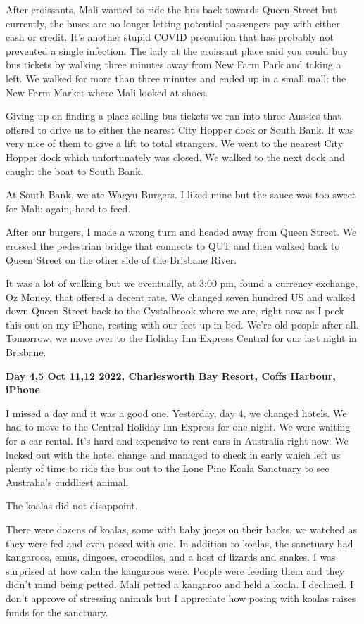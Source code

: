 After croissants, Mali wanted to ride the bus back towards Queen Street
but currently, the buses are no longer letting potential passengers pay
with either cash or credit. It's another stupid COVID precaution that
has probably not prevented a single infection. The lady at the croissant
place said you could buy bus tickets by walking three minutes away from
New Farm Park and taking a left. We walked for more than three minutes
and ended up in a small mall: the New Farm Market where Mali looked at
shoes.

Giving up on finding a place selling bus tickets we ran into three
Aussies that offered to drive us to either the nearest City Hopper dock
or South Bank. It was very nice of them to give a lift to total
strangers. We went to the nearest City Hopper dock which unfortunately
was closed. We walked to the next dock and caught the boat to South
Bank.

At South Bank, we ate Wagyu Burgers. I liked mine but the sauce was too
sweet for Mali: again, hard to feed.

After our burgers, I made a wrong turn and headed away from Queen
Street. We crossed the pedestrian bridge that connects to QUT and then
walked back to Queen Street on the other side of the Brisbane River.

It was a lot of walking but we eventually, at 3:00 pm, found a currency
exchange, Oz Money, that offered a decent rate. We changed seven hundred
US and walked down Queen Street back to the Cystalbrook where we are,
right now as I peck this out on my iPhone, resting with our feet up in
bed. We're old people after all. Tomorrow, we move over to the Holiday
Inn Express Central for our last night in Brisbane.

\textbf{Day 4,5 Oct 11,12 2022, Charlesworth Bay Resort, Coffs Harbour, iPhone}

I missed a day and it was a good one. Yesterday, day 4, we changed
hotels. We had to move to the Central Holiday Inn Express for one night.
We were waiting for a car rental. It's hard and expensive to rent cars
in Australia right now. We lucked out with the hotel change and managed
to check in early which left us plenty of time to ride the bus out to
the \href{https://lonepinekoalasanctuary.com/}{Lone Pine Koala
Sanctuary} to see Australia's cuddliest animal.

The koalas did not disappoint.

There were dozens of koalas, some with baby joeys on their backs, we
watched as they were fed and even posed with one. In addition to koalas,
the sanctuary had kangaroos, emus, dingoes, crocodiles, and a host of
lizards and snakes. I was surprised at how calm the kangaroos were.
People were feeding them and they didn't mind being petted. Mali petted
a kangaroo and held a koala. I declined. I don't approve of stressing
animals but I appreciate how posing with koalas raises funds for the
sanctuary.

